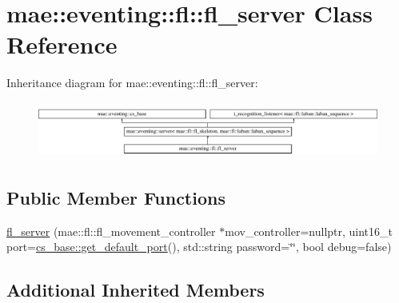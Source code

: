 \hypertarget{classmae_1_1eventing_1_1fl_1_1fl__server}{\section{mae\-:\-:eventing\-:\-:fl\-:\-:fl\-\_\-server Class Reference}
\label{classmae_1_1eventing_1_1fl_1_1fl__server}
}
Inheritance diagram for mae\-:\-:eventing\-:\-:fl\-:\-:fl\-\_\-server\-:\begin{figure}[H]
\begin{center}
\leavevmode
\includegraphics[height=1.883408cm]{classmae_1_1eventing_1_1fl_1_1fl__server}
\end{center}
\end{figure}
\subsection*{Public Member Functions}
\begin{DoxyCompactItemize}
\item 
\hyperlink{classmae_1_1eventing_1_1fl_1_1fl__server_ad87469875e9078e7ef3dce69553f2cb3}{fl\-\_\-server} (mae\-::fl\-::fl\-\_\-movement\-\_\-controller $\ast$mov\-\_\-controller=nullptr, uint16\-\_\-t port=\hyperlink{classmae_1_1eventing_1_1cs__base_a5c068f50b548ec7299133976c00fa5a4}{cs\-\_\-base\-::get\-\_\-default\-\_\-port}(), std\-::string password=\char`\"{}\char`\"{}, bool debug=false)
\end{DoxyCompactItemize}
\subsection*{Additional Inherited Members}



